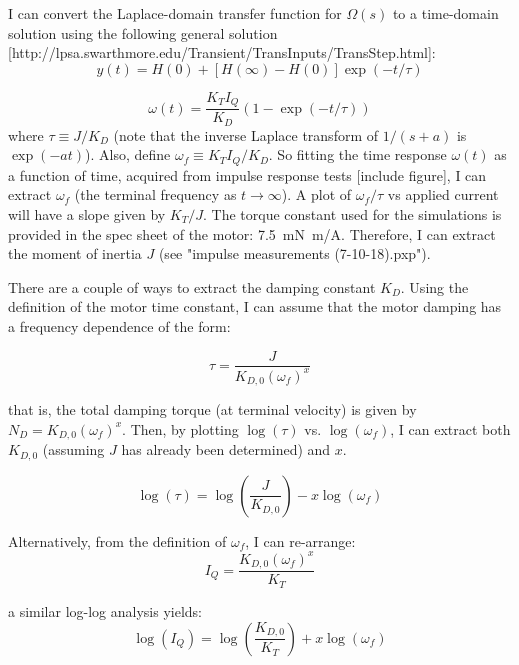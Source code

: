 \documentclass[11pt]{article} %
\begin{document}
I can convert the Laplace-domain transfer function for $\Omega(s)$ to a time-domain solution using the following general solution [http://lpsa.swarthmore.edu/Transient/TransInputs/TransStep.html]: 
\begin{equation}
y(t) = H(0) + [H(\infty) - H(0)]\exp(-t/\tau)
\end{equation}

\begin{equation}
\omega(t) = \frac{K_T I_Q}{K_D} \left(1 - \exp(-t/\tau)\right)
\end{equation}
\noindent where $\tau \equiv J/K_D$ (note that the inverse Laplace transform of $1/(s + a)$ is $\exp(-a t)$). Also, define $\omega_f \equiv K_T I_Q/K_D$. So fitting the time response $\omega(t)$ as a function of time, acquired from impulse response tests [include figure], I can extract $\omega_f$ (the terminal frequency as $t \rightarrow \infty$). A plot of $\omega_f/\tau$ vs applied current will have a slope given by $K_T/J$. The torque constant used for the simulations is provided in the spec sheet of the motor: \SI{7.5}{mN.m/A}. Therefore, I can extract the moment of inertia $J$ (see "impulse measurements (7-10-18).pxp").

There are a couple of ways to extract the damping constant $K_D$. Using the definition of the motor time constant, I can assume that the motor damping has a frequency dependence of the form:

\begin{equation}
\tau = \frac{J}{K_{D,0} (\omega_f)^x}
\end{equation}

\noindent that is, the total damping torque (at terminal velocity) is given by $N_D = K_{D,0} (\omega_f)^x$. Then, by plotting $\log(\tau)$ vs. $\log(\omega_f)$, I can extract both $K_{D,0}$ (assuming $J$ has already been determined) and $x$.

\begin{equation}
\log(\tau) = \log\left(\frac{J}{K_{D,0}}\right) - x \log(\omega_f)
\end{equation}

Alternatively, from the definition of $\omega_f$, I can re-arrange:
\begin{equation}
I_Q = \frac{K_{D,0} (\omega_f)^x}{K_T}
\end{equation}

\noindent a similar log-log analysis yields:
\begin{equation}
\log(I_Q) = \log\left(\frac{K_{D,0}}{K_T}\right) + x \log(\omega_f)
\end{equation}
\end{document}
